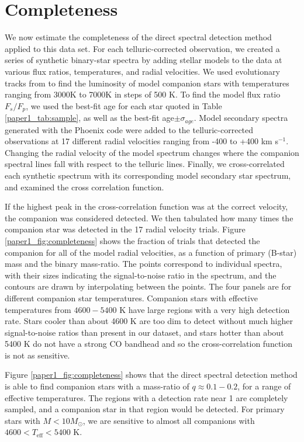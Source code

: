 \section{Completeness}
\label{paper1_sec:completeness}
We now estimate the completeness of the direct spectral detection
method applied to this data set. For each telluric-corrected observation, we
created a series of synthetic binary-star spectra by adding stellar models to
the data at various flux ratios, temperatures, and radial
velocities. We used evolutionary tracks from \cite{Landin2008} to
find the luminosity of model companion stars with temperatures ranging from 3000K to
7000K in steps of 500 K. To find the model flux ratio $F_s/F_p$, we
used the best-fit age for each star quoted in
Table \ref{paper1_tab:sample}, as well as the best-fit age$\pm
\sigma_{age}$. Model secondary spectra generated with the Phoenix code
\citep{Hauschildt1999} were added to the telluric-corrected
observations at 17 different radial velocities ranging
from -400 to +400 km s$^{-1}$. Changing the radial velocity of the model
spectrum changes where the companion spectral lines fall with respect
to the telluric lines. Finally, we cross-correlated each synthetic
spectrum with its corresponding model secondary star spectrum, and examined the cross
correlation function. 

If the highest peak in the cross-correlation function was at the
correct velocity, the companion was considered detected. We then
tabulated how many times the companion star was detected in the 17
radial velocity trials. Figure \ref{paper1_fig:completeness} shows the
fraction of trials that detected the companion for all of the model
radial velocities, as a function of primary (B-star) mass and the binary mass-ratio. The points
correspond to individual spectra, with their sizes indicating the
signal-to-noise ratio in the spectrum, and the contours are drawn by
interpolating between the points.  The four panels are for different companion star temperatures. Companion stars with effective
temperatures from $4600-5400$ K have large regions with a very high
detection rate. Stars cooler than about 4600 K are too dim to detect
without much higher signal-to-noise ratios than present in our dataset, and stars hotter than about
5400 K do not have a strong CO bandhead and so the cross-correlation
function is not as sensitive. 

Figure \ref{paper1_fig:completeness} shows that the direct spectral detection
method is able to find companion stars with a mass-ratio of $q\approx
0.1-0.2$, for a range of effective temperatures. The regions with a 
detection rate near 1 are completely sampled, and a companion star in 
that region would be detected. For primary stars with $M < 10 M_{\odot}$, we are sensitive to almost all companions with $4600 < T_\mathrm{eff} < 5400$ K.




